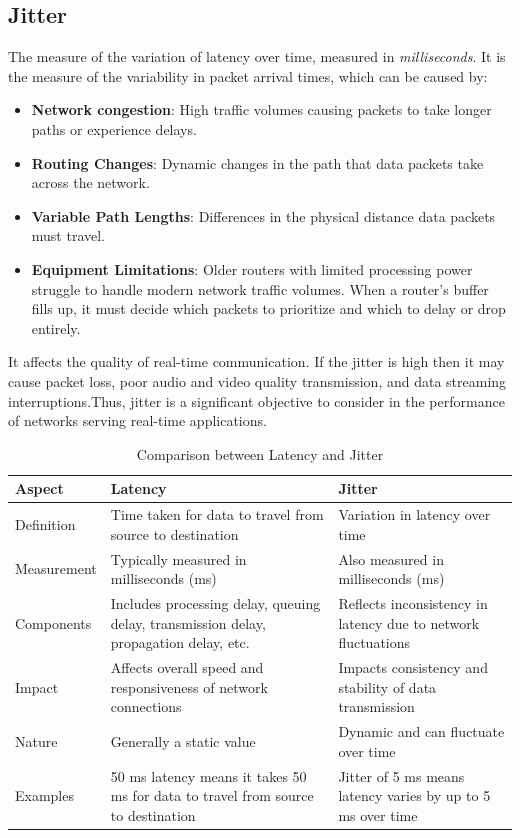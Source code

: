 \documentclass[11pt,a4paper]{article}
\begin{document}
	\subsection{Jitter}
	The measure of the variation of latency over time, measured in \textit{milliseconds}. It is the measure of the variability in packet arrival times, which can be caused by:
	\begin{itemize}
		\item \textbf{Network congestion}: High traffic volumes causing packets to take longer paths or experience delays.
		\item \textbf{Routing Changes}: Dynamic changes in the path that data packets take across the network.
		\item \textbf{Variable Path Lengths}: Differences in the physical distance data packets must travel.
		\item \textbf{Equipment Limitations}: Older routers with limited processing power struggle to handle modern network traffic volumes. When a router's buffer fills up, it must decide which packets to prioritize and which to delay or drop entirely.
	\end{itemize}
	It affects the quality of real-time communication. If the jitter is high then it may cause packet loss, poor audio and video quality transmission, and data streaming interruptions.Thus, jitter is a significant objective to consider in the performance of networks serving real-time applications.
	
	\begin{table}[h!]
		\centering
		\begin{tabular}{|l|p{6cm}|p{6cm}|}
			\hline
			\textbf{Aspect} & \textbf{Latency} & \textbf{Jitter} \\
			\hline
			Definition & Time taken for data to travel from source to destination & Variation in latency over time \\
			\hline
			Measurement & Typically measured in milliseconds (ms) & Also measured in milliseconds (ms) \\
			\hline
			Components & Includes processing delay, queuing delay, transmission delay, propagation delay, etc. & Reflects inconsistency in latency due to network fluctuations \\
			\hline
			Impact & Affects overall speed and responsiveness of network connections & Impacts consistency and stability of data transmission \\
			\hline
			Nature & Generally a static value & Dynamic and can fluctuate over time \\
			\hline
			Examples & 50 ms latency means it takes 50 ms for data to travel from source to destination & Jitter of 5 ms means latency varies by up to 5 ms over time \\
			\hline
		\end{tabular}
		\caption{Comparison between Latency and Jitter}
	\end{table}
	
\end{document}
